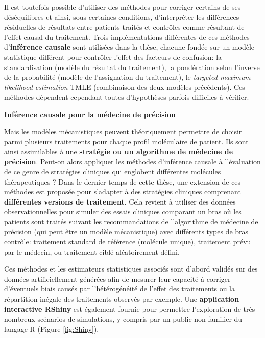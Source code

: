 \documentclass[a4paper,12pt,twoside,onecolumn,openright,final,oldfontcommands]{memoir}
\begin{document}
Il est toutefois possible d'utiliser des méthodes pour corriger certains
de ses déséquilibres et ainsi, sous certaines conditions, d'interpréter
les différences résiduelles de résultats entre patients traités et
contrôles comme résultant de l'effet causal du traitement. Trois
implémentations différentes de ces méthodes d'\textbf{inférence causale}
sont utilisées dans la thèse, chacune fondée sur un modèle statistique
différent pour contrôler l'effet des facteurs de confusion: la
standardisation (modèle du résultat du traitement), la pondération selon
l'inverse de la probabilité (modèle de l'assignation du traitement), le
\emph{targeted maximum likelihood estimation} TMLE (combinaison des deux
modèles précédents). Ces méthodes dépendent cependant toutes
d'hypothèses parfois difficiles à vérifier.

\textbf{Inférence causale pour la médecine de précision}

Mais les modèles mécanistiques peuvent théoriquement permettre de
choisir parmi plusieurs traitements pour chaque profil moléculaire de
patient. Ils sont ainsi assimilables à une \textbf{stratégie ou un
algorithme de médecine de précision}. Peut-on alors appliquer les
méthodes d'inférence causale à l'évaluation de ce genre de stratégies
cliniques qui englobent différentes molécules thérapeutiques ? Dans le
dernier temps de cette thèse, une extension de ces méthodes est proposée
pour s'adapter à des stratégies cliniques comprenant \textbf{différentes
versions de traitement}. Cela revient à utiliser des données
observationnelles pour simuler des essais cliniques comparant un bras où
les patients sont traités suivant les recommandations de l'algorithme de
médecine de précision (qui peut être un modèle mécanistique) avec
différents types de bras contrôle: traitement standard de référence
(molécule unique), traitement prévu par le médecin, ou traitement ciblé
aléatoirement défini.

Ces méthodes et les estimateurs statistiques associés sont d'abord
validés sur des données artificiellement générées afin de mesurer leur
capacité à corriger d'éventuels biais causés par l'hétérogénéité de
l'effet des traitements ou la répartition inégale des traitements
observés par exemple. Une \textbf{application interactive RShiny} est
également fournie pour permettre l'exploration de très nombreux
scénarios de simulations, y compris par un public non familier du
langage R (Figure \ref{fig:Shiny}).
\end{document}
